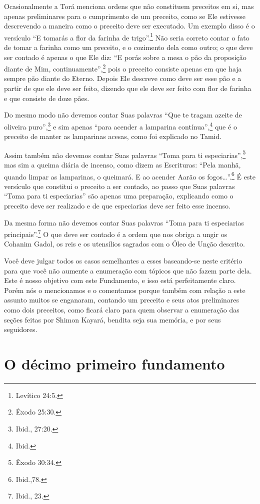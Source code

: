 Ocasionalmente a Torá menciona ordens que não constituem preceitos em
si, mas apenas preliminares para o cumprimento de um preceito, como se
Ele estivesse descrevendo a maneira como o preceito deve ser executado.
Um exemplo disso é o versículo ``E tomarás a flor da farinha de trigo''.\footnote{Levítico 24:5.} Não seria correto contar o fato de tomar a farinha
como um preceito, e o cozimento dela como outro; o que deve ser contado
é apenas o que Ele diz: ``E porás sobre a mesa o pão da proposição
diante de Mim, continuamente'',\footnote{Êxodo 25:30.} pois o preceito consiste
apenas em que haja sempre pão diante do Eterno. Depois Ele descreve como
deve ser esse pão e a partir de que ele deve ser feito, dizendo que ele
deve ser feito com flor de farinha e que consiste de doze pães.

Do mesmo modo não devemos contar Suas palavras ``Que te tragam azeite de
oliveira puro'',\footnote{Ibid., 27:20.} e sim apenas ``para acender a lamparina
contínua'',\footnote{Ibid.} que é o preceito de manter as lamparinas acesas,
como foi explicado no Tamid.

Assim também não devemos contar Suas palavras ``Toma para ti
especiarias'',\footnote{Êxodo 30:34.} mas sim a queima diária de incenso, como
dizem as Escrituras: ``Pela manhã, quando limpar as lamparinas, o
queimará. E ao acender Aarão os fogos\ldots{}''.\footnote{Ibid.,78.} É este versículo que constitui o
preceito a ser contado, ao passo que Suas palavras ``Toma para ti
especiarias'' são apenas uma preparação, explicando como o preceito deve
ser realizado e de que especiarias deve ser feito esse incenso.

Da mesma forma não devemos contar Suas palavras ``Toma para ti
especiarias principais''.\footnote{Ibid., 23.} O que deve ser contado é a ordem
que nos obriga a ungir os Cohanim Gadol, os reis e os utensílios
sagrados com o Óleo de Unção descrito.

Você deve julgar todos os casos semelhantes a esses baseando-se neste
critério para que você não aumente a enumeração com tópicos que não
fazem parte dela. Este é nosso objetivo com este Fundamento, e isso está
perfeitamente claro. Porém nós o mencionamos e o comentamos porque
também com relação a este assunto muitos se enganaram, contando um
preceito e seus atos preliminares como dois preceitos, como ficará
claro para quem observar a enumeração das seções feitas por Shimon
Kayará, bendita seja sua memória, e por seus seguidores.

\chapter*{O décimo primeiro fundamento}

